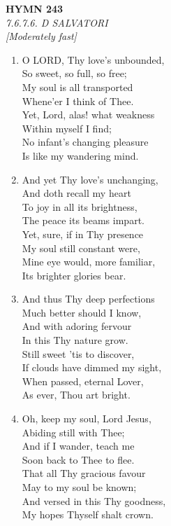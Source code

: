 \documentclass[11pt,a4paper]{article}
\begin{document}
\newpage
\begin{center}
    {\Large \textbf{HYMN 243}}
    \\
    \textit{7.6.7.6. D SALVATORI}
    \\
    \textit{\small [Moderately fast]}
\end{center}
\vspace{1em}

\begin{enumerate}
    \item O LORD, Thy love's unbounded, \\
            So sweet, so full, so free; \\
        My soul is all transported \\
            Whene'er I think of Thee. \\
        Yet, Lord, alas! what weakness \\
            Within myself I find; \\
        No infant's changing pleasure \\
            Is like my wandering mind.

    \item And yet Thy love's unchanging, \\
            And doth recall my heart \\
        To joy in all its brightness, \\
            The peace its beams impart. \\
        Yet, sure, if in Thy presence \\
            My soul still constant were, \\
        Mine eye would, more familiar, \\
            Its brighter glories bear.

    \item And thus Thy deep perfections \\
            Much better should I know, \\
        And with adoring fervour \\
            In this Thy nature grow. \\
        Still sweet 'tis to discover, \\
            If clouds have dimmed my sight, \\
        When passed, eternal Lover, \\
            As ever, Thou art bright.

    \item Oh, keep my soul, Lord Jesus, \\
            Abiding still with Thee; \\
        And if I wander, teach me \\
            Soon back to Thee to flee. \\
        That all Thy gracious favour \\
            May to my soul be known; \\
        And versed in this Thy goodness, \\
            My hopes Thyself shalt crown.

\end{enumerate}
\end{document}
